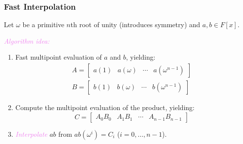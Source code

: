 \documentclass{beamer}
\newcommand{\its}[1]{\textcolor{violet}{\emph{#1}}}
\begin{document}
\begin{frame}
    \frametitle{Fast Interpolation}
    
    Let $\omega$ be a primitive $n$th root of unity (introduces symmetry) and
    $a,b \in F[x]$. \pause \vfill

    \its{Algorithm idea:}
    \begin{enumerate}[label=\arabic*.]
        \item Fast multipoint evaluation of $a$ and $b$, yielding:
            \begin{gather*}
                A = \begin{bmatrix}
                    a(1) & a(\omega) & \cdots & a(\omega^{n - 1})
                \end{bmatrix} \\
                B = \begin{bmatrix}
                    b(1) & b(\omega) & \cdots & b(\omega^{n - 1})
                \end{bmatrix}
            \end{gather*}
            \pause
        \item Compute the multipoint evaluation of the product, yielding:
            $$
                C = \begin{bmatrix}
                    A_0B_0 & A_1B_1 & \cdots & A_{n - 1}B_{n - 1}
                \end{bmatrix}
            $$
            \pause
        \item \its{Interpolate} $ab$ from $ab(\omega^i) = C_i$ ($i = 0, \dots,
            n - 1$).
    \end{enumerate}
\end{frame}
\end{document}
